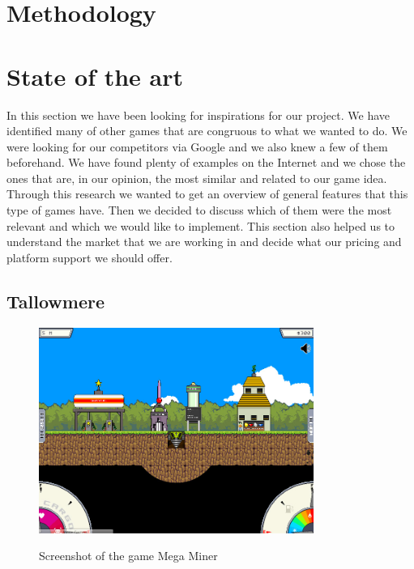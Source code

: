 \documentclass[12p]{article}
\begin{document}

\newpage
\section{Methodology} \label{Methodology}


\newpage
\section{State of the art}

In this section we have been looking for inspirations for our project. We have identified many of other games that are congruous to what we wanted to do.
We were looking for our competitors via Google and we also knew a few of them beforehand. We have found plenty of examples on the Internet and we chose the ones that are, in our opinion, the most similar and related to our game idea. Through this research we wanted to get an overview of general features that this type of games have. Then we decided to discuss which of them were the most relevant and which we would like to implement. This section also helped us to understand the market that we are working in and decide what our pricing and platform support we should offer.


\subsection{Tallowmere} \label{StateOfTheArt_Tallowmere}

\begin{figure}[ht]
  \center
  \includegraphics[width=0.8\textwidth]{StateOfTheArtScreenshots/mega_miner}
  \label{StateOfTheArt_Screenshots_Tallowmere}
  \caption{Screenshot of the game Mega Miner \cite{MegaMinerScreenshot}}
\end{figure}
\end{document}
